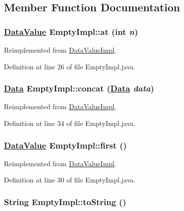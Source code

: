 \subsection{Member Function Documentation}
\hypertarget{classEmptyImpl_a0}{
\subsubsection[at]{\setlength{\rightskip}{0pt plus 5cm}\hyperlink{interfaceDataValue}{Data\-Value} Empty\-Impl::at (int {\em n})}}
\label{classEmptyImpl_a0}




Reimplemented from \hyperlink{classDataValueImpl_a4}{Data\-Value\-Impl}.

Definition at line 26 of file Empty\-Impl.java.\hypertarget{classEmptyImpl_a2}{
\subsubsection[concat]{\setlength{\rightskip}{0pt plus 5cm}\hyperlink{interfaceData}{Data} Empty\-Impl::concat (\hyperlink{interfaceData}{Data} {\em data})}}
\label{classEmptyImpl_a2}




Reimplemented from \hyperlink{classDataValueImpl_a3}{Data\-Value\-Impl}.

Definition at line 34 of file Empty\-Impl.java.\hypertarget{classEmptyImpl_a1}{
\subsubsection[first]{\setlength{\rightskip}{0pt plus 5cm}\hyperlink{interfaceDataValue}{Data\-Value} Empty\-Impl::first ()}}
\label{classEmptyImpl_a1}




Reimplemented from \hyperlink{classDataValueImpl_a0}{Data\-Value\-Impl}.

Definition at line 30 of file Empty\-Impl.java.\hypertarget{classEmptyImpl_a4}{
\subsubsection[toString]{\setlength{\rightskip}{0pt plus 5cm}String Empty\-Impl::to\-String ()}}
\label{classEmptyImpl_a4}




